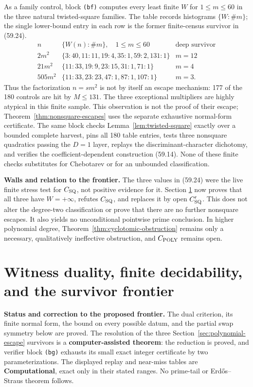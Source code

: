 \documentclass[10pt,reqno]{amsart}
\theoremstyle{definition}
\newcommand{\1}{\mathbf 1}
\begin{document}
As a family control, block \texttt{(bf)} computes every least finite $W$ for
$1\leq m\leq60$ in the three natural twisted-square families.  The table
records histograms $\{W:\#m\}$; the single lower-bound entry in each row is
the former finite-census survivor in (59.24).
\begin{equation}\tag{59.27}
\begin{array}{c|l|c}
 n&\{W(n):\#m\},\quad1\leq m\leq60&\text{deep survivor}\\ \hline
 2m^2&\{3:40,11:11,19:4,35:1,59:2,131:1\}&m=12\\
 21m^2&\{11:33,19:9,23:15,31:1,71:1\}&m=4\\
 505m^2&\{11:33,23:23,47:1,87:1,107:1\}&m=3.
\end{array}
\end{equation}
Thus the factorization $n=sm^2$ is not by itself an escape mechanism:
177 of the 180 controls are hit by $M\leq131$.  The three exceptional
multipliers are highly atypical in this finite sample.  This observation is
not the proof of their escape; Theorem~\ref{thm:nonsquare-escapes} uses the
separate exhaustive normal-form certificate.  The same block checks
Lemma~\ref{lem:twisted-square} exactly over a bounded complete harvest, pins
all 180 table entries, tests three nonsquare quadratics passing the $D=1$
layer, replays the discriminant-character dichotomy, and verifies the
coefficient-dependent construction (59.14).  None of these finite checks
substitutes for Chebotarev or for an unbounded classification.

\medskip\noindent\textbf{Walls and relation to the frontier.}
The three values in (59.24) were the live finite stress test for
$C_{\rm SQ}$, not positive evidence for it.  Section
\ref{sec:witness-duality} now proves that all three have $W=+\infty$, refutes
$C_{\rm SQ}$, and replaces it by open $C_{\rm SQ}'$.  This does not alter
the degree-two classification or prove that there are no further nonsquare
escapes.  It also yields no unconditional pointwise prime conclusion.  In
higher polynomial degree, Theorem~\ref{thm:cyclotomic-obstruction} remains
only a necessary, qualitatively ineffective obstruction, and
$C_{\rm POLY}$ remains open.

\section{Witness duality, finite decidability, and the survivor frontier}
\label{sec:witness-duality}
\medskip\noindent\textbf{Status and correction to the proposed frontier.}
The dual criterion, its finite normal form, the bound on every possible
datum, and the partial swap symmetry below are proved.  The resolution of
the three Section~\ref{sec:polynomial-escape} survivors is a
\textbf{computer-assisted theorem}: the reduction is proved, and verifier
block \texttt{(bg)} exhausts its small exact integer certificate by two
parameterizations.  The displayed replay and near-miss tables are
\textbf{Computational}, exact only in their stated ranges.  No prime-tail or
Erd\H{o}s--Straus theorem follows.
\end{document}

